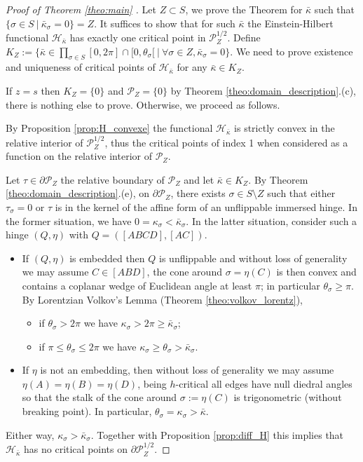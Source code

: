 \documentclass[a4paper,12pt]{article}
\def\adm{\P}
\def\adm{\mathcal{P}}
\def\P{\mathcal{P}}
\theoremstyle{definition}
\begin{document}
			
			\begin{proof}[Proof of Theorem \ref{theo:main} ] Let $Z\subset S$, we prove the Theorem for $\bar\kappa$ such that 
				$\{\sigma\in S~|~\bar\kappa_\sigma=0\}=Z$. 
				It suffices to show that for such $\bar\kappa$ the Einstein-Hilbert functional $\mathcal{H}_{\bar\kappa}$ has exactly one critical point in $\adm_Z^{1/2}$.
				Define $K_Z:=\{\bar\kappa \in \prod_{\sigma\in S} [0,2\pi]\cap[0,\theta_\sigma[ ~|~ \forall \sigma\in Z,\bar \kappa_\sigma=0\}$. We need to prove existence and uniqueness of critical points of $\mathcal{H}_{\bar\kappa}$ for any $\bar\kappa \in K_Z$.
				
				If $z=s$ then $K_Z=\{0\}$ and $\adm_Z = \{0\}$ by Theorem \ref{theo:domain_description}.(c), there is nothing else to prove. Otherwise, we proceed as follows. 
				
				
				
				By Proposition \ref{prop:H_convexe} the functional $\mathcal{H}_{\bar\kappa}$ is strictly convex in the relative interior of $\adm^{1/2}_Z$, thus the critical points of index 1 when considered as a function on the relative interior of $\adm_Z$.
				
				Let $\tau\in \partial \adm_Z$ the relative boundary of $\adm_Z$ and let $\bar\kappa\in K_Z$. By Theorem \ref{theo:domain_description}.(e), on $\partial \adm_Z$, there exists $\sigma\in S\setminus Z$ such that either $\tau_\sigma =0$ or $\tau$ is in the kernel of the affine form of an unflippable immersed hinge. In the former situation, we have $0=\kappa_\sigma<\bar\kappa_\sigma$. In the latter situation, 
				consider such a hinge $(Q,\eta)$ with $Q=([ABCD],[AC])$.
				\begin{itemize}
				 \item If $(Q,\eta)$ is embedded then $Q$ is unflippable and without loss of generality we may assume $C\in [ABD]$, the cone around $\sigma=\eta(C)$ is then convex and contains a coplanar wedge of Euclidean angle at least $\pi$; in particular $\theta_\sigma \geq \pi$. By Lorentzian Volkov's Lemma (Theorem \ref{theo:volkov_lorentz}), 
				 \begin{itemize}
				 \item if $\theta_\sigma>2\pi$ we have $\kappa_\sigma>2\pi\geq \bar\kappa_\sigma$;
				 \item if $\pi\leq\theta_\sigma\leq 2\pi$ we have $\kappa_\sigma\geq \theta_\sigma>\bar\kappa_\sigma$. 
				 \end{itemize}
				 
				 
				 \item If $\eta$ is not an embedding, then without loss of generality we may assume $\eta(A)=\eta(B)=\eta(D)$, being $h$-critical all edges have null diedral angles so that the stalk of the cone around $\sigma:=\eta(C)$ is trigonometric (without breaking point). In particular, $\theta_\sigma=\kappa_\sigma>\bar\kappa$.
				\end{itemize}
				Either way, $\kappa_\sigma>\bar\kappa_\sigma$. 	Together with Proposition \ref{prop:diff_H} this implies that $\mathcal{H}_{\bar\kappa}$ has no critical points on $\partial\adm_Z^{1/2}$. 
				

\end{proof}
\end{document}
